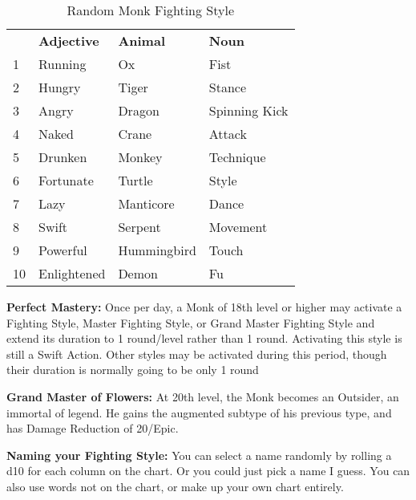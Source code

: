 \begin{wraptable}{O}{8.75cm}
\caption{Random Monk Fighting Style}
\begin{tabular}{l l l l}
 & \textbf{Adjective} & \textbf{Animal} & \textbf{Noun}\\
1 & Running & Ox & Fist\\
2 & Hungry & Tiger & Stance\\
3 & Angry & Dragon & Spinning Kick\\
4 & Naked & Crane & Attack\\
5 & Drunken & Monkey & Technique\\
6 & Fortunate & Turtle & Style\\
7 & Lazy & Manticore & Dance\\
8 & Swift & Serpent & Movement\\
9 & Powerful & Hummingbird & Touch\\
10 & Enlightened & Demon & Fu\\
\end{tabular}
\end{wraptable}

\textbf{Perfect Mastery:} Once per day, a Monk of 18th level or higher may activate a Fighting Style, Master Fighting Style, or Grand Master Fighting Style and extend its duration to 1 round/level rather than 1 round. Activating this style is still a Swift Action. Other styles may be activated during this period, though their duration is normally going to be only 1 round

\textbf{Grand Master of Flowers:} At 20th level, the Monk becomes an Outsider, an immortal of legend. He gains the augmented subtype of his previous type, and has Damage Reduction of 20/Epic.

\textbf{Naming your Fighting Style:} You can select a name randomly by rolling a d10 for each column on the chart. Or you could just pick a name I guess. You can also use words not on the chart, or make up your own chart entirely.
